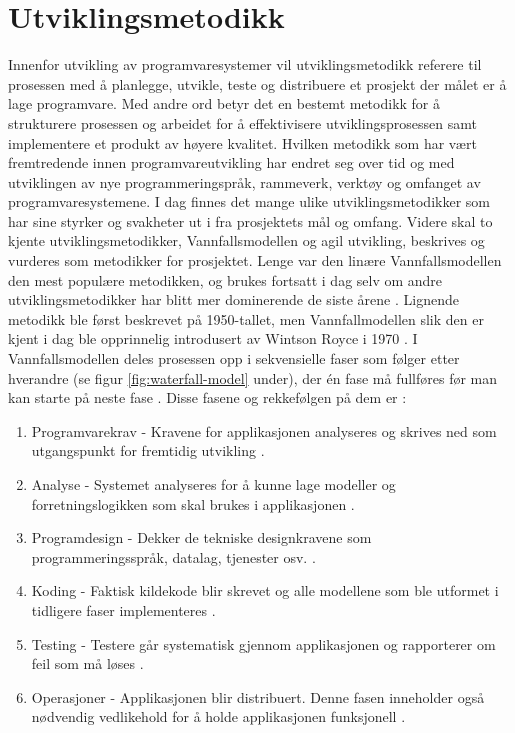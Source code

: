\section{Utviklingsmetodikk}
Innenfor utvikling av programvaresystemer vil utviklingsmetodikk referere til prosessen med å planlegge, utvikle, teste og distribuere et prosjekt \cite{rachieleSoftwareDevelopmentMethodologies2018} der målet er å lage programvare. Med andre ord betyr det en bestemt metodikk for å strukturere prosessen og arbeidet for å effektivisere utviklingsprosessen samt implementere et produkt av høyere kvalitet. Hvilken metodikk som har vært fremtredende innen programvareutvikling har endret seg over tid og med utviklingen av nye programmeringspråk, rammeverk, verktøy og omfanget av programvaresystemene. I dag finnes det mange ulike utviklingsmetodikker som har sine styrker og svakheter ut i fra prosjektets mål og omfang. Videre skal to kjente utviklingsmetodikker, Vannfallsmodellen og agil utvikling, beskrives og vurderes som metodikker for prosjektet.   
\newline 
\newline 
Lenge var den linære Vannfallsmodellen den mest populære metodikken, og brukes fortsatt i dag selv om andre utviklingsmetodikker har blitt mer dominerende de siste årene \cite{WaterfallModelWhat2016}. Lignende metodikk ble først beskrevet på 1950-tallet, men Vannfallmodellen slik den er kjent i dag ble opprinnelig introdusert av Wintson Royce i 1970 \cite[~s.329]{royceManagingDevelopmentLarge1970}. I Vannfallsmodellen deles prosessen opp i sekvensielle faser som følger etter hverandre (se figur \ref{fig:waterfall-model} under), der én fase må fullføres før man kan starte på neste fase \cite{WaterfallModelSoftware}. Disse fasene og rekkefølgen på dem er \cite{royceManagingDevelopmentLarge1970}: 
\begin{enumerate}
    \item Programvarekrav - Kravene for applikasjonen analyseres og skrives ned som utgangspunkt for fremtidig utvikling \cite{WaterfallModelWhat2016}.
    \item Analyse - Systemet analyseres for å kunne lage modeller og forretningslogikken som skal brukes i applikasjonen \cite{WaterfallModelWhat2016}.
    \item Programdesign - Dekker de tekniske designkravene som programmeringsspråk, datalag, tjenester osv. \cite{WaterfallModelWhat2016}.
    \item Koding - Faktisk kildekode blir skrevet og alle modellene som ble utformet i tidligere faser implementeres \cite{WaterfallModelWhat2016}.
    \item Testing - Testere går systematisk gjennom applikasjonen og rapporterer om feil som må løses \cite{WaterfallModelWhat2016}.
    \item Operasjoner - Applikasjonen blir distribuert. Denne fasen inneholder også nødvendig vedlikehold for å holde applikasjonen funksjonell \cite{WaterfallModelWhat2016}. 
\end{enumerate}
